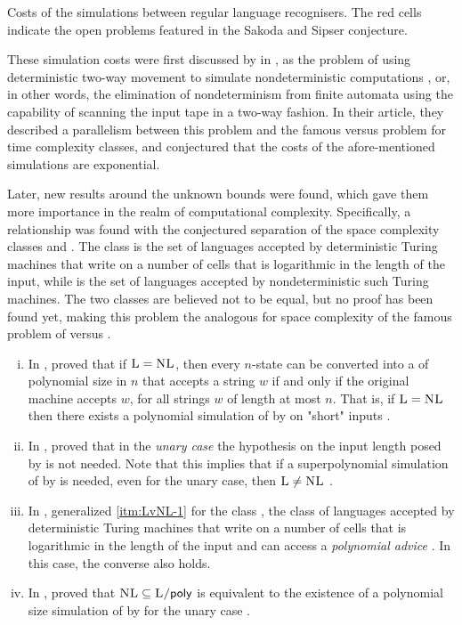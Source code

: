 \begin{table}
	\centering
	\caption[Costs of the simulations between regular language recognisers.]{Costs of the simulations between regular language recognisers.
		The red cells indicate the open problems featured in the Sakoda and Sipser conjecture.}
	\label{tab:sims-core-general-context}
\end{table}

These simulation costs were first discussed by \citeauthor{SakSip78} in \citeyear{SakSip78}, as the problem of using deterministic two-way movement to simulate nondeterministic computations \cite{SakSip78}, or, in other words, the elimination of nondeterminism from finite automata using the capability of scanning the input tape in a two-way fashion.
In their article, they described a parallelism between this problem and the famous \cP versus \cNP problem for time complexity classes, and conjectured that the costs of the afore-mentioned simulations are exponential.

Later, new results around the unknown bounds were found, which gave them more importance in the realm of computational complexity.
Specifically, a relationship was found with the conjectured separation of the space complexity classes \cL and \cNL.
The class \cL is the set of languages accepted by deterministic Turing machines that write on a number of cells that is logarithmic in the length of the input, while \cNL is the set of languages accepted by nondeterministic such Turing machines.
The two classes are believed not to be equal, but no proof has been found yet, making this problem the analogous for space complexity of the famous problem of \cP versus \cNP.
\begin{enumerate}[(i)]
	\item\label{itm:LvNL-1} In \citeyear{BerLin77}, \citeauthor{BerLin77} proved that if $\textsc{L}=\textsc{NL}$, then every $n$-state \TNFA can be converted into a \TDFA of polynomial size in $n$ that accepts a string $w$ if and only if the original machine accepts $w$, for all strings $w$ of length at most $n$.
	      That is, if $\textsc{L}=\textsc{NL}$ then there exists a polynomial simulation of \TNFAs by \TDFAs on "short" inputs \cite{BerLin77}.
	\item In \citeyear{GefPig11}, \citeauthor{GefPig11} proved that in the \emph{unary case} the hypothesis on the input length posed by \citeauthor{BerLin77} is not needed.
	      Note that this implies that if a superpolynomial simulation of \TNFAs by \TDFAs is needed, even for the unary case, then $\textsc{L}\ne\textsc{NL}$ \cite{GefPig11}.
	\item In \citeyear{Kap14}, \citeauthor{Kap14} generalized \ref{itm:LvNL-1} for the class \cPolyL, the class of languages accepted by deterministic Turing machines that write on a number of cells that is logarithmic in the length of the input and can access a \emph{polynomial advice} \cite{Kap14,KarLip82}. In this case, the converse also holds.
	\item In \citeyear{KapPig12}, \citeauthor{KapPig12} proved that $\textsc{NL}\subseteq\textsc{L/\ensuremath{\mathsf{poly}}}$ is equivalent to the existence of a polynomial size simulation of \TNFAs by \TDFAs for the unary case \cite{KapPig12}.
\end{enumerate}

